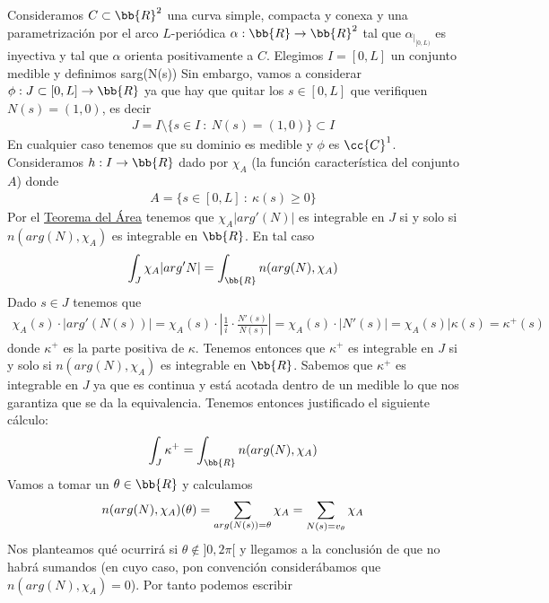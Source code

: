 \begin{ejemplo}
    Consideramos $C\subset \bb{R}^2$ una curva simple, compacta y conexa y una parametrización por el arco $L$-periódica $\alpha: \bb{R} \to \bb{R}^2$ tal que $\alpha_{|_{[0,L)}}$ es inyectiva y tal que $\alpha$ orienta positivamente a $C$. Elegimos $I=[0,L]$ un conjunto medible y definimos
         {s}{arg(N(s))}
    Sin embargo, vamos a considerar $\phi: J\subset [0,L] \to \bb{R}$ ya que hay que quitar los $s\in [0,L]$ que verifiquen $N(s)=(1,0)$, es decir
    \begin{gather*}
        J = I \setminus \{ s\in I \ : \ N(s)=(1,0) \}\subset I
    \end{gather*}
    En cualquier caso tenemos que su dominio es medible y $\phi$ es $\cc{C}^1$. Consideramos $h: I \to \bb{R}$ dado por $\chi_A$ (la función característica del conjunto $A$) donde 
    \begin{gather*}
        A = \{s\in [0,L] \ : \ \kappa(s) \geq 0 \}
    \end{gather*}
    Por el \hyperref[teo:area]{Teorema del Área} tenemos que $\chi_A|arg'(N)|$ es integrable en $J$ si y solo si $n(arg(N), \chi_A)$ es integrable en $\bb{R}$. En tal caso
    \begin{gather*}
        \int_J \chi_A |arg'N| = \int_\bb{R} n(arg(N), \chi_A)
    \end{gather*}
    Dado $s\in J$ tenemos que 
    \begin{gather*}
        \chi_A(s) \cdot |arg'(N(s))| = \chi_A(s) \cdot \left| \frac{1}{i} \cdot \frac{N'(s)}{N(s)} \right| = \chi_A(s) \cdot |N'(s)| = \chi_A(s)|\kappa(s) = \kappa^+(s)
    \end{gather*}
    donde $\kappa^+$ es la parte positiva de $\kappa$. Tenemos entonces que $\kappa^+$ es integrable en $J$ si y solo si $n(arg(N), \chi_A)$ es integrable en $\bb{R}$. Sabemos que $\kappa^+$ es integrable en $J$ ya que es continua y está acotada dentro de un medible lo que nos garantiza que se da la equivalencia. Tenemos entonces justificado el siguiente cálculo:
    \begin{gather*}
        \int_J \kappa^+ = \int_\bb{R} n(arg(N), \chi_A)
    \end{gather*}
    Vamos a tomar un $\theta \in \bb{R}$ y calculamos
    \begin{gather*}
        n(arg(N), \chi_A)(\theta) = \sum_{\smash{arg(N(s))=\theta}} \chi_A = \sum_{N(s)=v_\theta} \chi_A
    \end{gather*}
    Nos planteamos qué ocurrirá si $\theta\notin ]0,2\pi[$ y llegamos a la conclusión de que no habrá sumandos (en cuyo caso, pon convención considerábamos que $n(arg(N), \chi_A)=0$). Por tanto podemos escribir

\end{ejemplo}
